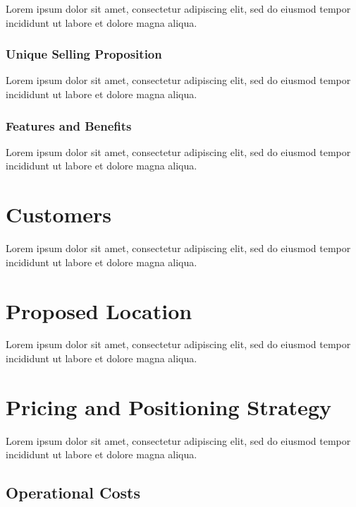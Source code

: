 Lorem ipsum dolor sit amet, consectetur adipiscing elit, sed do eiusmod tempor incididunt ut labore et dolore magna aliqua.

\subsubsection*{Unique Selling Proposition}

Lorem ipsum dolor sit amet, consectetur adipiscing elit, sed do eiusmod tempor incididunt ut labore et dolore magna aliqua.

\subsubsection*{Features and Benefits}

Lorem ipsum dolor sit amet, consectetur adipiscing elit, sed do eiusmod tempor incididunt ut labore et dolore magna aliqua.


\section{Customers}

Lorem ipsum dolor sit amet, consectetur adipiscing elit, sed do eiusmod tempor incididunt ut labore et dolore magna aliqua.


\section{Proposed Location}

Lorem ipsum dolor sit amet, consectetur adipiscing elit, sed do eiusmod tempor incididunt ut labore et dolore magna aliqua.


\section{Pricing and Positioning Strategy}

Lorem ipsum dolor sit amet, consectetur adipiscing elit, sed do eiusmod tempor incididunt ut labore et dolore magna aliqua.

\subsection{Operational Costs}

